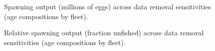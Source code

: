 \documentclass[
]{scrartcl}
\begin{document}
\begin{figure}[H]


\caption{\label{fig-sens_age_spout}Spawning output (millions of eggs)
across data removal sensitivities (age compositions by fleet).}

\end{figure}%

\begin{figure}[H]


\caption{\label{fig-sens_age_relsp}Relative spawning output (fraction
unfished) across data removal sensitivities (age compositions by
fleet).}

\end{figure}%
\end{document}
